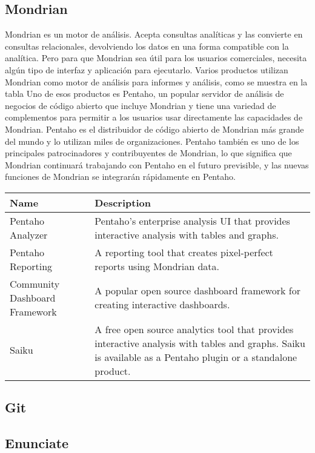 \begin{spacing}{1.5}
	\subsection{Mondrian}
			Mondrian es un motor de análisis. Acepta consultas analíticas y las convierte en consultas relacionales, devolviendo los datos en una forma compatible con la analítica. Pero para que Mondrian sea útil para los usuarios comerciales, necesita algún tipo de interfaz y aplicación para ejecutarlo.
			Varios productos utilizan Mondrian como motor de análisis para informes y análisis, como se muestra en la tabla  Uno de esos productos es Pentaho, un popular servidor de análisis de negocios de código abierto que incluye Mondrian y tiene una variedad de complementos para permitir a los usuarios usar directamente las capacidades de Mondrian. Pentaho es el distribuidor de código abierto de Mondrian más grande del mundo y lo utilizan miles de organizaciones. Pentaho también es uno de los principales patrocinadores y contribuyentes de Mondrian, lo que significa que Mondrian continuará trabajando con Pentaho en el futuro previsible, y las nuevas funciones de Mondrian se integrarán rápidamente en Pentaho.
			\begin{table}[h!]
				\begin{tabular}{ |p{3cm}|p{11cm|}| }
				\hline
				\rowcolor[HTML]{CBCEFB} 
				Name & Description\\ \hline
				Pentaho Analyzer & Pentaho’s enterprise analysis UI that provides interactive analysis with tables and graphs.\\\hline
				Pentaho Reporting & A reporting tool that creates pixel-perfect reports using Mondrian data.\\ \hline
				Community Dashboard Framework & A popular open source dashboard framework for creating interactive dashboards.\\\hline
				Saiku & A free open source analytics tool that provides interactive analysis with tables and graphs. Saiku is available as a Pentaho plugin or a standalone product.\\ \hline
				\end{tabular}
			\end{table}
	\subsection{Git}
			\lipsum[1-2]
	\subsection{Enunciate}
			\lipsum[1-2]

\end{spacing}
